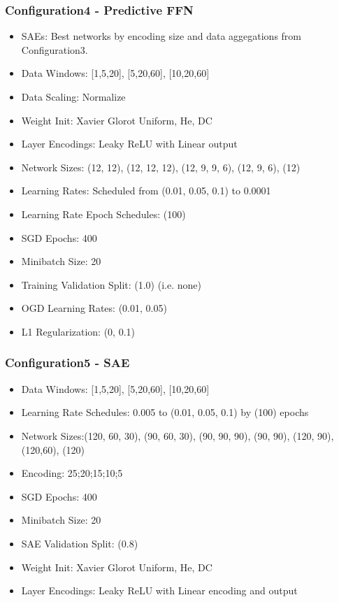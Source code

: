 \documentclass[a4paper,11pt,oneside]{article}
\theoremstyle{plain}
\theoremstyle{definition}
\begin{document}
\subsubsection{Configuration4 - Predictive FFN}\label{config4}
\begin{itemize}
	\item SAEs: Best networks by encoding size and data aggegations from Configuration3.
	\item Data Windows: [1,5,20], [5,20,60], [10,20,60]
	\item Data Scaling: Normalize
	\item Weight Init: Xavier Glorot Uniform, He, DC
	\item Layer Encodings: Leaky ReLU with Linear output
	\item Network Sizes: (12, 12), (12, 12, 12), (12, 9, 9, 6), (12, 9, 6), (12)
	\item Learning Rates: Scheduled from (0.01, 0.05, 0.1) to 0.0001
	\item Learning Rate Epoch Schedules: (100)
	\item SGD Epochs: 400
	\item Minibatch Size: 20
	\item Training Validation Split: (1.0) (i.e. none)
	\item OGD Learning Rates: (0.01, 0.05)
	\item L1 Regularization: (0, 0.1)
\end{itemize}


\subsubsection{Configuration5 - SAE}\label{config5}


\begin{itemize}
	\item Data Windows: [1,5,20], [5,20,60], [10,20,60]
	\item Learning Rate Schedules: 0.005 to (0.01, 0.05, 0.1) by (100) epochs
	\item Network Sizes:(120, 60, 30), (90, 60, 30), (90, 90, 90), (90, 90), (120, 90), (120,60), (120)
	\item Encoding: 25;20;15;10;5
	\item SGD Epochs: 400
	\item Minibatch Size: 20
	\item SAE Validation Split: (0.8)
	\item Weight Init: Xavier Glorot Uniform, He, DC
	\item Layer Encodings: Leaky ReLU with Linear encoding and output
	
\end{itemize}
\end{document}
